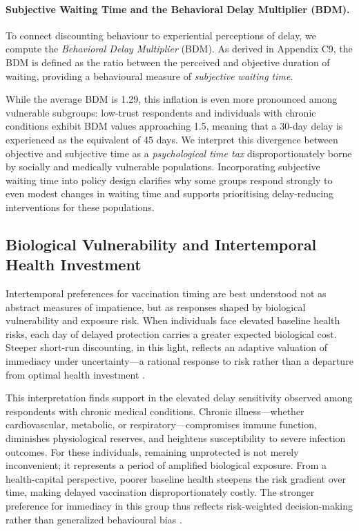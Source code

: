 \documentclass[preprint,12pt]{elsarticle}
\providecommand{\parencite}{\citep}
\begin{document}
\paragraph{Subjective Waiting Time and the Behavioral Delay Multiplier (BDM).}
To connect discounting behaviour to experiential perceptions of delay, we compute the \textit{Behavioral Delay Multiplier} (BDM). As derived in Appendix C9, the BDM is defined as the ratio between the perceived and objective duration of waiting, providing a behavioural measure of \textit{subjective waiting time}.

While the average BDM is 1.29, this inflation is even more pronounced among vulnerable subgroups: low-trust respondents and individuals with chronic conditions exhibit BDM values approaching 1.5, meaning that a 30-day delay is experienced as the equivalent of 45 days. We interpret this divergence between objective and subjective time as a \textit{psychological time tax} disproportionately borne by socially and medically vulnerable populations. Incorporating subjective waiting time into policy design clarifies why some groups respond strongly to even modest changes in waiting time and supports prioritising delay-reducing interventions for these populations.



\subsection{Biological Vulnerability and Intertemporal Health Investment}

Intertemporal preferences for vaccination timing are best understood not as abstract measures of impatience, but as responses shaped by biological vulnerability and exposure risk. When individuals face elevated baseline health risks, each day of delayed protection carries a greater expected biological cost. Steeper short-run discounting, in this light, reflects an adaptive valuation of immediacy under uncertainty---a rational response to risk rather than a departure from optimal health investment \parencite{Grossman1972, Attema2018}.

This interpretation finds support in the elevated delay sensitivity observed among respondents with chronic medical conditions. Chronic illness---whether cardiovascular, metabolic, or respiratory---compromises immune function, diminishes physiological reserves, and heightens susceptibility to severe infection outcomes. For these individuals, remaining unprotected is not merely inconvenient; it represents a period of amplified biological exposure. From a health-capital perspective, poorer baseline health steepens the risk gradient over time, making delayed vaccination disproportionately costly. The stronger preference for immediacy in this group thus reflects risk-weighted decision-making rather than generalized behavioural bias \parencite{Bok2024, Brewer2017}.
\end{document}
